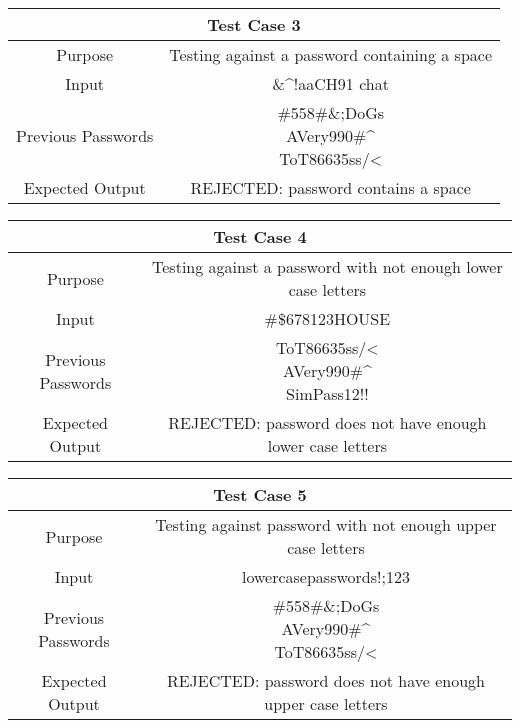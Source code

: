 \documentclass[12pt,letterpaper]{article}
\begin{document}
\begin{center}
  \begin{tabular}{||c|c||}
  \hline
  \multicolumn{2}{||c||}{Test Case 3} \\
  \hline
  Purpose & Testing against a password containing a space\\
  \hline
  Input & \&\^{}!aaCH91 chat \\
  \hline
  Previous Passwords &  \specialcell{\#558\#\&;DoGs\\AVery990\#\^{}\\ToT86635ss/\textless} \\
  \hline
  Expected Output & REJECTED: password contains a space \\
  \hline
  \end{tabular}
\end{center}

\begin{center}
  \begin{tabular}{||c|c||}
  \hline
  \multicolumn{2}{||c||}{Test Case 4} \\
  \hline
  Purpose & Testing against a password with not enough lower case letters \\
  \hline
  Input & \#\$678123HOUSE \\
  \hline
  Previous Passwords &  \specialcell{ToT86635ss/\textless\\AVery990\#\^{}\\SimPass12!!} \\
  \hline
  Expected Output & REJECTED: password does not have enough lower case letters \\
  \hline
  \end{tabular}
\end{center}

\begin{center}
  \begin{tabular}{||c|c||}
  \hline
  \multicolumn{2}{||c||}{Test Case 5} \\
  \hline
  Purpose & Testing against password with not enough upper case letters \\
  \hline
  Input & lowercasepasswords!;123 \\
  \hline
  Previous Passwords &  \specialcell{\#558\#\&;DoGs\\AVery990\#\^{}\\ToT86635ss/\textless} \\
  \hline
  Expected Output & REJECTED: password does not have enough upper case letters \\
  \hline
  \end{tabular}
\end{center}
\end{document}
